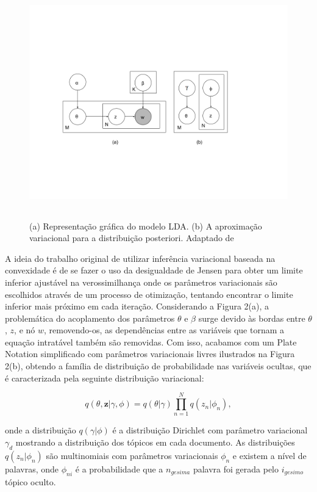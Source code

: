 \documentclass[12pt,a4paper]{article}
\begin{document}
\begin{figure}[h]
	\centering
    \includegraphics[height=10cm]{images/figure_2.png}
    \caption{(a) Representação gráfica do modelo LDA. (b) A aproximação variacional para a distribuição posteriori. Adaptado de }
\end{figure}

A ideia do trabalho original de utilizar inferência variacional baseada na convexidade é de se fazer o uso da desigualdade de Jensen para obter um limite inferior ajustável na verossimilhança \cite{jordan1999introduction} onde os parâmetros variacionais são escolhidos através de um processo de otimização, tentando encontrar o limite inferior mais próximo em cada iteração. Considerando a Figura 2(a), a problemática do acoplamento dos parâmetros $\theta$ e $\beta$ surge devido às bordas entre $\theta$, $z$, e nó $w$, removendo-os, as dependências entre as variáveis que tornam a equação intratável também são removidas. Com isso, acabamos com um Plate Notation simplificado com parâmetros variacionais livres ilustrados na Figura 2(b), obtendo a família de distribuição de probabilidade nas variáveis ocultas, que é caracterizada pela seguinte distribuição variacional:

\begin{equation}
q(\theta,\textbf{z}|\gamma,\phi)=q(\theta|\gamma)\prod_{n=1}^{N}q(z_n|\phi_n), 
\end{equation}

onde a distribuição  $q(\gamma|\phi)$ é a distribuição Dirichlet com parâmetro variacional $\gamma_d$ mostrando a distribuição dos tópicos em cada documento. As distribuições $q(z_n | \phi_n)$ são multinomiais com parâmetros variacionais $\phi_n$ e existem a nível de palavras, onde $\phi_{ni}$ é a probabilidade que a $n_{gesima}$ palavra foi gerada pelo $i_{gesimo}$ tópico oculto.
\end{document}
